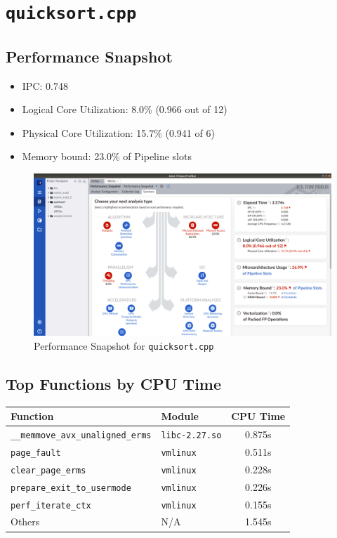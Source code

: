 \documentclass[11pt, swedish, openany]{book}
\begin{document}
\newpage
\section{\texttt{quicksort.cpp}}

\subsection*{Performance Snapshot}
\begin{itemize}
    \item IPC: 0.748
    \item Logical Core Utilization: 8.0\% (0.966 out of 12)
    \item Physical Core Utilization: 15.7\% (0.941 of 6)
    \item Memory bound: 23.0\% of Pipeline slots
\end{itemize}

\begin{figure}[H]
    \centering
    \includegraphics[scale=0.25]{vtune/quicksort/ps.png}
    \caption{Performance Snapshot for \texttt{quicksort.cpp}}
\end{figure}

\newpage
\subsection*{Top Functions by CPU Time}
\begin{table}[H]
    \begin{tabular}{||l|l||c||}
        \hline
        Function                                   & Module                & CPU Time \\
        \hline
        \texttt{\_\_memmove\_avx\_unaligned\_erms} & \texttt{libc-2.27.so} & 0.875s   \\
        \texttt{page\_fault}                       & \texttt{vmlinux}      & 0.511s   \\
        \texttt{clear\_page\_erms}                 & \texttt{vmlinux}      & 0.228s   \\
        \texttt{prepare\_exit\_to\_usermode}       & \texttt{vmlinux}      & 0.226s   \\
        \texttt{perf\_iterate\_ctx}                & \texttt{vmlinux}      & 0.155s   \\
        Others                                     & N/A                   & 1.545s   \\
        \hline
    \end{tabular}
\end{table}
\end{document}
